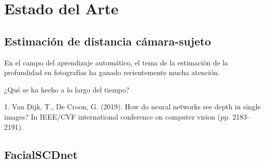 \chapter{Estado del Arte}
\thispagestyle{empty}

\section{Estimación de distancia cámara-sujeto}
En el campo del aprendizaje automático, el tema de la estimación de la profundidad en fotografías ha ganado recientemente mucha atención. 


¿Qué se ha hecho a lo largo del tiempo?

1. Van Dijk, T.,  De Croon, G. (2019). How do neural networks see depth in single images? In IEEE/CVF international conference on computer vision (pp. 2183–2191).

\section{FacialSCDnet}
